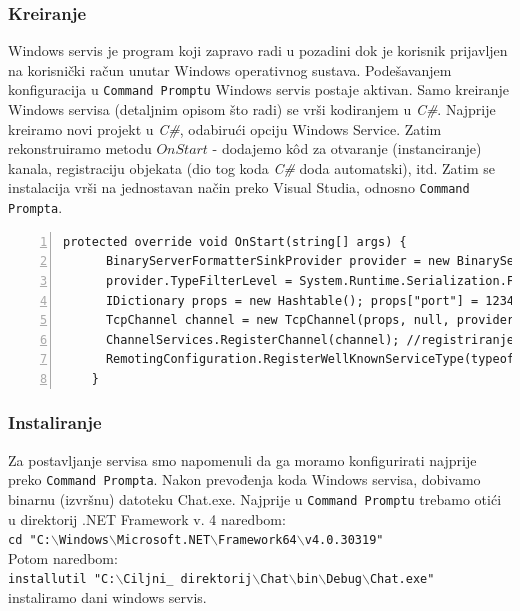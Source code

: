 \documentclass[10pt,a4paper,onecolumn,titlepage]{article}
\begin{document}
\subsubsection{Kreiranje}
Windows servis je program koji zapravo radi u pozadini dok je korisnik prijavljen na korisnički račun unutar Windows operativnog sustava. Podešavanjem
konfiguracija u \texttt{Command Promptu} Windows servis postaje aktivan. Samo kreiranje Windows servisa (detaljnim opisom što radi) se vrši kodiranjem u \textit{C\#}.
Najprije kreiramo novi projekt u \textit{C\#}, odabirući opciju Windows Service. Zatim
rekonstruiramo metodu $OnStart$ - dodajemo k\^{o}d za otvaranje (instanciranje)
kanala, registraciju objekata (dio tog koda \textit{C\#} doda automatski), itd. Zatim
se instalacija vrši na jednostavan način preko Visual Studia, odnosno \texttt{Command
Prompta}.
\lstset{style=sharpc}
\begin{lstlisting}[numbers=left, breaklines=true]
protected override void OnStart(string[] args) {
      BinaryServerFormatterSinkProvider provider = new BinaryServerFormatterSinkProvider(); 
      provider.TypeFilterLevel = System.Runtime.Serialization.Formatters.TypeFilterLevel.Full; 
      IDictionary props = new Hashtable(); props["port"] = 12345; //server ce slushati a portu 12345
      TcpChannel channel = new TcpChannel(props, null, provider); 
      ChannelServices.RegisterChannel(channel); //registriranje na kanal
      RemotingConfiguration.RegisterWellKnownServiceType(typeof(ChatServer), "Chat.ChatServer", WellKnownObjectMode.Singleton);//ime servera je "Chat.Chatserver"
    }

\end{lstlisting}
\subsubsection{Instaliranje}
Za postavljanje servisa smo napomenuli da ga moramo konfigurirati najprije
preko \texttt{Command Prompta}. Nakon prevođenja koda Windows servisa, dobivamo binarnu (izvršnu) datoteku Chat.exe. Najprije u \texttt{Command Promptu} trebamo otići u direktorij .NET Framework v. 4 naredbom:\\
\texttt{cd "C:$\backslash$Windows$\backslash$Microsoft.NET$\backslash$Framework64$\backslash$v4.0.30319"}\\
Potom naredbom:\\
\texttt{installutil "C:$\backslash$Ciljni\_ direktorij$\backslash$Chat$\backslash$bin$\backslash$Debug$\backslash$Chat.exe"}\\
instaliramo dani windows servis.
\end{document}
